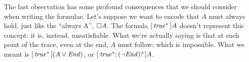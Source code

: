 The last observation has some profound consequences that we should consider
when writing the formulae. Let's suppose we want to encode that $A$ must
always hold, just like the \ltl{} ``always A'', $\square A$. The \ldl{}
formula ${[\, {\text{\textit{true}}^*} \,]A}$ doesn't represent this concept: it is, instead,
unsatisfiable. What we're actually saying is that at each point of the trace,
even at the end, $A$ must follow; which is impossible. What we meant is
${[\, {\text{\textit{true}}^*} \,](A \lor \text{\textit{End}})}$, or ${[\, {\text{\textit{true}}^*; (\neg \text{\textit{End}})?} \,]A}$.





